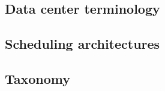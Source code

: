 

\subsection{Data center terminology}


\subsection{Scheduling architectures}


\subsection{Taxonomy} \label{rm_taxonomy}
